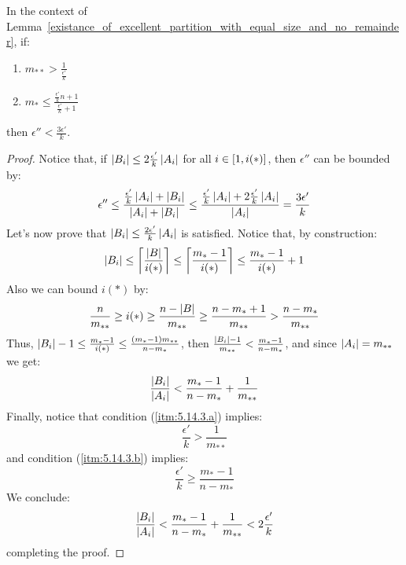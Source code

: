     \begin{remark}[Remark 5.14.3]\label{epsilons_proportion_can_be_k}
        In the context of Lemma~\ref{existance_of_excellent_partition_with_equal_size_and_no_remainder}, if:
        \begin{enumerate}[label=(\alph*), ref=\alph*]
            \item \label{itm:5.14.3.a} $m_{**} > \frac{1}{\frac{\epsilon'}{k}}$
            \item \label{itm:5.14.3.b} $m_* \leq \frac{\frac{\epsilon'}{k} n + 1}{\frac{\epsilon'}{k} + 1}$
        \end{enumerate}
        then $\epsilon'' < \frac{3 \epsilon'}{k}$.
        \begin{proof}
            Notice that, if $\left| B_i \right| \leq 2 \frac{\epsilon'}{k} \left| A_i \right|$ for all $i \in \left[ 1, i(*) \right]$,
            then $\epsilon''$ can be bounded by:
            $$
                \epsilon'' \leq \frac{\frac{\epsilon'}{k} \left| A_i \right| + \left| B_i \right|}{\left| A_i \right| + \left| B_i \right|}
                \leq \frac{\frac{\epsilon'}{k} \left| A_i \right| + 2 \frac{\epsilon'}{k} \left| A_i \right|}{\left| A_i \right|}
                = \frac{3 \epsilon'}{k}
            $$
            Let's now prove that $\left| B_i \right| \leq \frac{2 \epsilon'}{k} \left| A_i \right|$ is satisfied.
            Notice that, by construction:
            $$
                \left| B_i \right| \leq \left\lceil \frac{\left| B \right|}{i(*)} \right\rceil \leq \left\lceil \frac{m_* - 1}{i(*)} \right\rceil \leq
                \frac{m_* - 1}{i(*)} + 1
            $$
            Also we can bound $i(*)$ by:
            $$
                \frac{n}{m_{**}} \geq i(*) \geq \frac{n - \left| B \right|}{m_{**}} \geq \frac{n - m_* + 1}{m_{**}} >
                \frac{n - m_*}{m_{**}}
            $$
            Thus, $\left| B_i \right| - 1 \leq \frac{m_* - 1}{i(*)} \leq \frac{\left( m_* - 1 \right) m_{**}}{n - m_*}$,
            then $\frac{\left| B_i \right| - 1}{m_{**}} < \frac{m_* - 1}{n - m_*}$, and since $\left| A_i \right| = m_{**}$
            we get:
            $$
                \frac{\left| B_i \right|}{\left| A_i \right|} < \frac{m_* - 1}{n - m_*} + \frac{1}{m_{**}}
            $$
            Finally, notice that condition (\ref{itm:5.14.3.a}) implies:
            $$
                \frac{\epsilon'}{k} > \frac{1}{m_{**}}
            $$
            and condition (\ref{itm:5.14.3.b}) implies:
            $$
                \frac{\epsilon'}{k} \geq \frac{m_* - 1}{n - m_*}
            $$
            We conclude:
            $$
                \frac{\left| B_i \right|}{\left| A_i \right|} < \frac{m_* - 1}{n - m_*} + \frac{1}{m_{**}} < 2 \frac{\epsilon'}{k}
            $$
            completing the proof.
        \end{proof}
    \end{remark}

